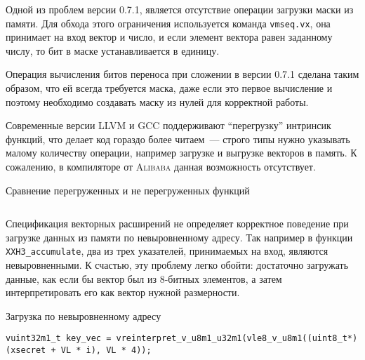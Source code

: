 Одной из проблем версии 0.7.1, является отсутствие операции загрузки маски из памяти.
Для обхода этого ограничения используется команда \texttt{vmseq.vx}, она принимает на вход вектор и число, и если элемент вектора равен заданному числу, то бит в маске устанавливается в единицу.

Операция вычисления битов переноса при сложении в версии 0.7.1 сделана таким образом, что ей всегда требуется маска, даже если это первое вычисление и поэтому необходимо создавать маску из нулей для корректной работы.

Современные версии \textsc{LLVM} и \textsc{GCC} поддерживают \enquote{перегрузку} интринсик функций, что делает код гораздо более читаем~--- строго типы нужно указывать малому количеству операции, например загрузке и выгрузке векторов в память.
К сожалению, в компиляторе от \textsc{Alibaba} данная возможность отсутствует.
\begin{listing}
	\caption{Сравнение перегруженных и не перегруженных функций}
	\inputminted[breaklines, frame=single]{c}{figures/generic.c}
\end{listing}

Спецификация векторных расширений \riscv{} не определяет корректное поведение при загрузке данных из памяти по невыровненному адресу.
Так например в функции \texttt{XXH3\_accumulate}, два из трех указателей, принимаемых на вход, являются невыровненными.
К счастью, эту проблему легко обойти: достаточно загружать данные, как если бы вектор был из 8-битных элементов, а затем интерпретировать его как вектор нужной размерности.
\begin{listing}
	\caption{Загрузка по невыровненному адресу}
	\begin{verbatim}
vuint32m1_t key_vec = vreinterpret_v_u8m1_u32m1(vle8_v_u8m1((uint8_t*)(xsecret + VL * i), VL * 4));
	\end{verbatim}
\end{listing}
